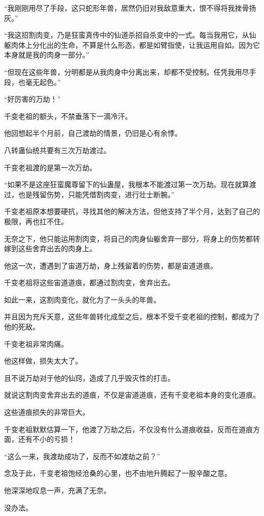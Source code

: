\begin{this_body}
“我刚刚用尽了手段，这只蛇形年兽，居然仍旧对我敌意重大，恨不得将我挫骨扬灰。”

“我这招割肉变，乃是狂蛮真传中的仙道杀招自杀变中的一式。每当我用它，从仙躯肉体上分化出的生命，不算是什么形态，都是如臂指使，让我运用自如。因为它本身就是我的肉身一部分。”

“但现在这些年兽，分明都是从我肉身中分离出来，却都不受控制。任凭我用尽手段，也毫无起色。”

“好厉害的万劫！”

千变老祖的额头，不禁垂落下一滴冷汗。

他回想起半个月前，自己渡劫的情景，仍旧是心有余悸。

八转蛊仙统共要有三次万劫渡过。

千变老祖渡的是第一次万劫。

“如果不是这座狂蛮魔尊留下的仙蛊屋，我根本不能渡过第一次万劫。现在就算渡过，也是残留伤势，只能凭借割肉变，进行壮士断腕。”

千变老祖原本想要硬抗，寻找其他的解决方法，但他支持了半个月，达到了自己的极限，再也扛不住。

无奈之下，他只能运用割肉变，将自己的肉身仙躯舍弃一部分，将身上的伤势都转嫁到这些舍弃出去的肉身上。

他这一次，遭遇到了宙道万劫，身上残留着的伤势，都是宙道道痕。

千变老祖将这些宙道道痕，都通过割肉变，舍弃出去。

如此一来，这割肉变化，就化为了一头头的年兽。

并且因为充斥天意，这些年兽转化成型之后，根本不受千变老祖的控制，都成为了他的死敌。

千变老祖非常肉痛。

他这样做，损失太大了。

且不说万劫对于他的仙窍，造成了几乎毁灭性的打击。

就说这割肉变舍弃出去的道痕，不仅是宙道道痕，还有千变老祖本身的变化道痕。

这些道痕损失的非常巨大。

千变老祖默默估算一下，他渡了万劫之后，不仅没有什么道痕收益，反而在道痕方面，还有不小的亏损！

“这么一来，我渡劫成功了，反而不如渡劫之前？”

念及于此，千变老祖饱经沧桑的心里，也不由地升腾起了一股辛酸之意。

他深深地叹息一声，充满了无奈。

没办法。


\end{this_body}
